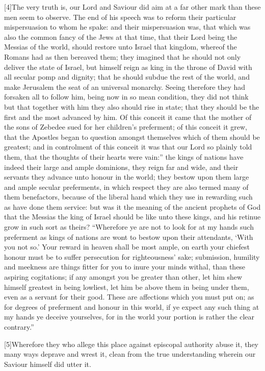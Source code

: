 [4]The very truth is, our Lord and Saviour did aim at a far other mark than these men seem to observe. The end of his speech was to reform their particular mispersuasion to whom he spake: and their mispersuasion was, that which was also the common fancy of the Jews at that time, that their  Lord being the Messias of the world, should restore unto Israel that kingdom, whereof the Romans had as then bereaved them; they imagined that he should not only deliver the state of Israel, but himself reign as king in the throne of David with all secular pomp and dignity; that he should subdue the rest of the world, and make Jerusalem the seat of an universal monarchy. Seeing therefore they had forsaken all to follow him, being now in so mean condition, they did not think but that together with him they also should rise in state; that they should be the first and the most advanced by him. Of this conceit it came that the mother of the sons of Zebedee sued for her children’s preferment; of this conceit it grew, that the Apostles began to question amongst themselves which of them should be greatest; and in controlment of this conceit it was that our Lord so plainly told them, that the thoughts of their hearts were vain:” the kings of nations have indeed their large and ample dominions, they reign far and wide, and their servants they advance unto honour in the world; they bestow upon them large and ample secular preferments, in which respect they are also termed many of them benefactors, because of the liberal hand which they use in rewarding such as have done them service: but was it the meaning of the ancient prophets of God that the Messias the king of Israel should be like unto these kings, and his retinue grow in such sort as theirs? “Wherefore ye are not to look for at my hands such preferment as kings of nations are wont to bestow upon their attendants, ‘With you not so.’ Your reward in heaven shall be most ample, on earth your chiefest honour must be to suffer persecution for righteousness’ sake; submission, humility and meekness are things fitter for you to inure your minds withal, than these aspiring cogitations; if any amongst you be greater than other, let him shew himself greatest in being lowliest, let him be above them in being under them, even as a servant for their good. These are affections which you must put on; as for degrees of preferment and honour in this world, if ye expect any such thing at my hands ye deceive yourselves, for in the world your portion is rather the clear contrary.”

[5]Wherefore they who allege this place against episcopal  authority abuse it, they many ways deprave and wrest it, clean from the true understanding wherein our Saviour himself did utter it.

